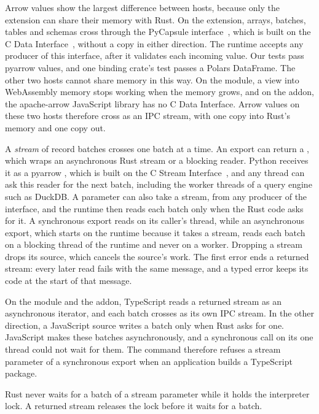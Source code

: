 \documentclass[sigconf,nonacm]{acmart}
\begin{document}
Arrow values show the largest difference between hosts, because only the extension can share their memory with Rust. On the extension, arrays, batches, tables and schemas cross through the PyCapsule interface~\cite{pycapsule}, which is built on the C Data Interface~\cite{arrowc}, without a copy in either direction. The runtime accepts any producer of this interface, after it validates each incoming value. Our tests pass pyarrow values, and one binding crate's test passes a Polars DataFrame. The other two hosts cannot share memory in this way. On the module, a view into WebAssembly memory stops working when the memory grows, and on the addon, the apache-arrow JavaScript library has no C Data Interface. Arrow values on these two hosts therefore cross as an IPC stream, with one copy into Rust's memory and one copy out.

A \emph{stream} of record batches crosses one batch at a time. An export can return a , which wraps an asynchronous Rust stream or a blocking reader. Python receives it as a pyarrow , which is built on the C Stream Interface~\cite{arrowc}, and any thread can ask this reader for the next batch, including the worker threads of a query engine such as DuckDB. A parameter can also take a stream, from any producer of the interface, and the runtime then reads each batch only when the Rust code asks for it. A synchronous export reads on its caller's thread, while an asynchronous export, which starts on the runtime because it takes a stream, reads each batch on a blocking thread of the runtime and never on a worker. Dropping a stream drops its source, which cancels the source's work. The first error ends a returned stream: every later read fails with the same message, and a typed error keeps its code at the start of that message.

On the module and the addon, TypeScript reads a returned stream as an asynchronous iterator, and each batch crosses as its own IPC stream. In the other direction, a JavaScript source writes a batch only when Rust asks for one. JavaScript makes these batches asynchronously, and a synchronous call on its one thread could not wait for them. The command therefore refuses a stream parameter of a synchronous export when an application builds a TypeScript package.

\begin{claim}
\label{clm:stream}
Rust never waits for a batch of a stream parameter while it holds the interpreter lock. A returned stream releases the lock before it waits for a batch.
\end{claim}
\end{document}
